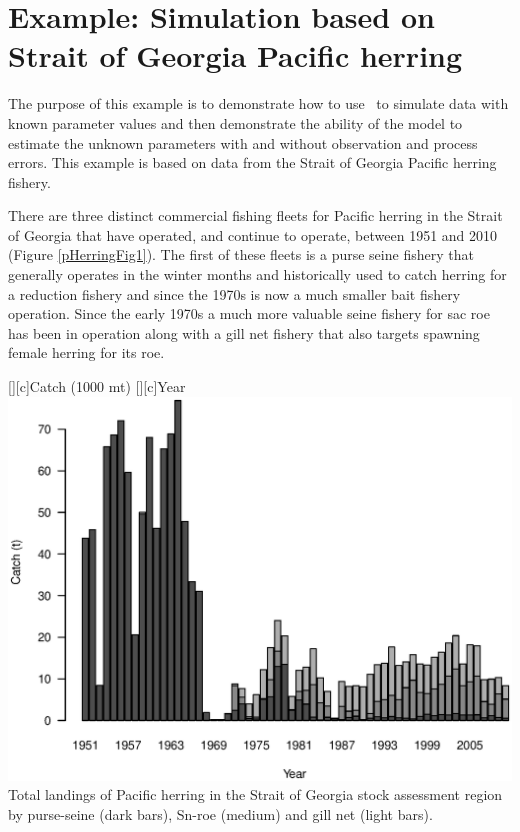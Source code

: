 \section{Example: Simulation based on Strait of Georgia Pacific herring}
\begin{multicols}{2}
The purpose of this example is to demonstrate how to use \iscam\ to simulate data with known parameter values and then demonstrate the ability of the model to estimate the unknown parameters with and without observation and process errors.  This example is based on data from the Strait of Georgia Pacific herring fishery.

There are three distinct commercial fishing fleets for Pacific herring in the Strait of Georgia that have operated, and continue to operate, between 1951 and 2010 (Figure \ref{pHerringFig1}).  The first of these fleets is a purse seine fishery that generally operates in the winter months and historically used to catch herring for a reduction fishery and since the 1970s is now a much smaller bait fishery operation.  Since the early 1970s a much more valuable seine fishery for sac roe has been in operation along with a gill net fishery that also targets spawning female herring for its roe.

\begin{figurehere}
	[][c]{Catch (1000 mt)}
	[][c]{Year}
	\includegraphics[width=\columnwidth]{iscamfigs/pHerringFig1.eps}\\
	\caption{Total landings of Pacific herring in the Strait of Georgia stock assessment region by purse-seine (dark bars), Sn-roe (medium) and gill net (light bars).}\label{pHerringFig1}
\end{figurehere}


\end{multicols}
